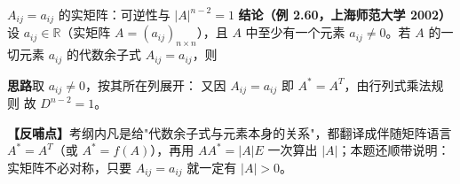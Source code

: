 \begin{fdeep}{$A_{ij}=a_{ij}$ 的实矩阵：可逆性与 $|A|^{n-2}=1$}
\textbf{结论（例 2.60，上海师范大学 2002）}\quad 设 $a_{ij}\in\mathbb{R}$（实矩阵 $A=(a_{ij})_{n\times n}$），且 $A$ 中至少有一个元素 $a_{ij}\neq0$。若 $A$ 的一切元素 $a_{ij}$ 的代数余子式 $A_{ij}=a_{ij}$，则

\textbf{思路}\quad 取 $a_{ij}\neq0$，按其所在列展开：
又因 $A_{ij}=a_{ij}$ 即 $A^{*}=A^{T}$，由行列式乘法规则
故 $D^{n-2}=1$。

\textbf{【反哺点】}考纲内凡是给"代数余子式与元素本身的关系"，都翻译成伴随矩阵语言 $A^{*}=A^{T}$（或 $A^{*}=f(A)$），再用 $AA^{*}=|A|E$ 一次算出 $|A|$；本题还顺带说明：实矩阵不必对称，只要 $A_{ij}=a_{ij}$ 就一定有 $|A|>0$。
\end{fdeep}


